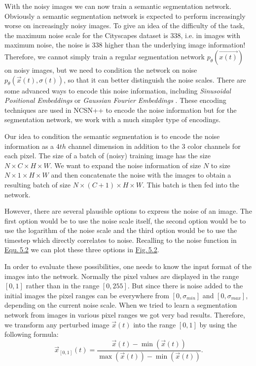 With the noisy images we can now train a semantic segmentation network. Obviously a semantic segmentation network is expected to perform increasingly worse on increasingly noisy images. To give an idea of the difficulty of the task, the maximum noise scale for the Cityscapes dataset is $338$, i.e. in images with maximum noise, the noise is $338$ higher than the underlying image information! Therefore, we cannot simply train a regular segmentation network $p_\theta(\vec{x(t)})$ on noisy images, but we need to condition the network on noise $p_\theta(\vec{x}(t), \sigma(t))$, so that it can better distinguish the noise scales. There are some advanced ways to encode this noise information, including \textit{Sinusoidal Positional Embeddings} \cite{attention} or \textit{Gaussian Fourier Embeddings} \cite{fourfeat}. These encoding techniques are used in NCSN++ to encode the noise information but for the segmentation network, we work with a much simpler type of encodings.

Our idea to condition the semantic segmentation is to encode the noise information as a $4th$ channel dimension in addition to the $3$ color channels for each pixel. The size of a batch of (noisy) training image has the size $N\times C\times H\times W$. We want to expand the noise information of size $N$ to size $N\times 1\times H\times W$ and then concatenate the noise with the images to obtain a resulting batch of size $N\times (C+1)\times H\times W$. This batch is then fed into the network.

However, there are several plausible options to express the noise of an image. The first option would be to use the noise scale itself, the second option would be to use the logarithm of the noise scale and the third option would be to use the timestep which directly correlates to noise. Recalling to the noise function in \hyperref[equ:5.2]{Equ.\,5.2} we can plot these three options in \hyperref[fig:5.2]{Fig.\,5.2}.

In order to evaluate these possibilities, one needs to know the input format of the images into the network. Normally the pixel values are displayed in the range $[0, 1]$ rather than in the range $[0, 255]$. But since there is noise added to the initial images the pixel ranges can be everywhere from $[0,\sigma_{min}]$ and $[0, \sigma_{max}]$, depending on the current noise scale. When we tried to learn a segmentation network from images in various pixel ranges we got very bad results. Therefore, we transform any perturbed image $\vec{x}(t)$ into the range $[0, 1]$ by using the following formula:
%
\begin{equation}
    \vec{x}_{[0,1]}(t)=\frac{\vec{x}(t)-\min(\vec{x}(t))}{\max(\vec{x}(t))-\min(\vec{x}(t))}.
\end{equation}
%

